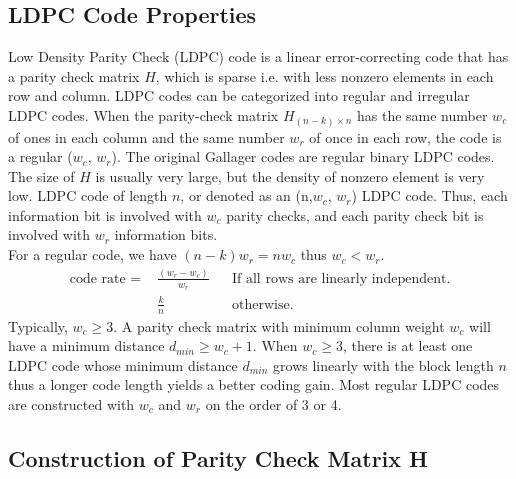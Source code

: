 \subsection{LDPC Code Properties}
Low Density Parity Check (LDPC) code is a linear error-correcting code that has a parity check matrix $H$, which is sparse i.e. with less nonzero elements in each row and column. LDPC codes can be categorized into regular and irregular LDPC codes. When the parity-check matrix $H_{(n - k)\times n}$ has the same number $w_c$ of ones in each column and the same number $w_r$ of once in each row, the code is a regular ($w_c$, $w_r$). The original Gallager codes are regular binary LDPC codes. The size of $H$ is usually very large, but the density of nonzero element is very low. LDPC code of length $n$, or denoted as an (n,$w_c$, $w_r$) LDPC code. Thus, each information bit is involved with $w_c$ parity checks, and each parity check bit is involved with $w_r$ information bits.\\
For a regular code, we have $(n-k)w_r = nw_c$ thus $w_c < w_r$.
\begin{equation}
    \label{eq:code rate}
    \begin{aligned}
        \text{code rate = } & \frac{(w_r - w_c)}{w_r} && \text{If all rows are linearly independent.} \\
        & \frac{k}{n} && \text{otherwise.}
    \end{aligned}
\end{equation}
Typically, $w_c \geq 3$. A parity check matrix with minimum column weight $w_c$ will have a minimum distance $d_{min} \geq w_c + 1$. When $w_c\geq 3$, there is at least one LDPC code whose minimum distance $d_{min}$ grows linearly with the block length $n$ thus a longer code length yields a better coding gain. Most regular LDPC codes are constructed with $w_c$ and $w_r$ on the order of 3 or 4.

\subsection{Construction of Parity Check Matrix H}
